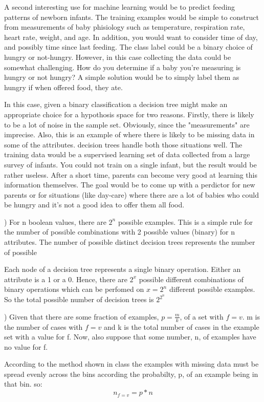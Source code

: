 \documentclass[12pt]{article}
\begin{document}
A second interesting use for machine learning would be to predict feeding patterns 
of newborn infants. The training examples would be simple to construct from measurements
of baby phisiology such as temperature, respiration rate, heart rate, weight, and age. 
In addition, you would want to consider time of day, and possibly time since last feeding. 
The class label could be a binary choice of hungry or not-hungry. However, in this case
collecting the data could be somewhat challenging. How do you determine if a baby you're 
measuring is hungry or not hungry? A simple solution would be to simply label them as hungry
if when offered food, they ate. 

In this case, given a binary classification a decision tree might make an appropriate 
choice for a hypothosis space for two reasons. Firstly, there is likely to be a lot of 
noise in the sample set. Obviously, since the "measurements" are imprecise. Also, 
this is an example of where there is likely to be missing data in some of the attributes. 
decision trees handle both those situations well. The training data would be a supervised
learning set of data collected from a large survey of infants. You could not train on a 
single infant, but the result would be rather useless. After a short time, parents can 
become very good at learning this information themselves. The goal would be to come 
up with a perdictor for new parents or for situations (like day-care) where there are a 
lot of babies who could be hungry and it's not a good idea to offer them all food. 

) For n boolean values, there are $2^n$ possible examples. This is a simple rule for
the number of possible combinations with 2 possible values (binary) for n attributes. 
The number of possible distinct decision trees represents the number of possible 

Each node of a decision tree represents a single binary operation. Either an attribute is
a 1 or a 0. Hence, there are $2^{x}$ possible different combinations of binary operations 
which can be perfomed on $x=2^n$ different possible examples. So the total possible number 
of decision trees is $2^{2^n}$

) Given that there are some fraction of examples, $p=\frac{m}{k}$, of a set with $f=v$. m is 
the number of cases with $f=v$ and k is the total number of cases in the example set with a value
for f. Now, also suppose that some number, n, of examples have no value for f.

According to the method shown in class the examples with missing data must be 
spread evenly across the bins according the probabilty, p, of an example being in that bin. 
so: 
\begin{equation}
    n_{f=v} = p*n 
\end{equation}
\end{document}
